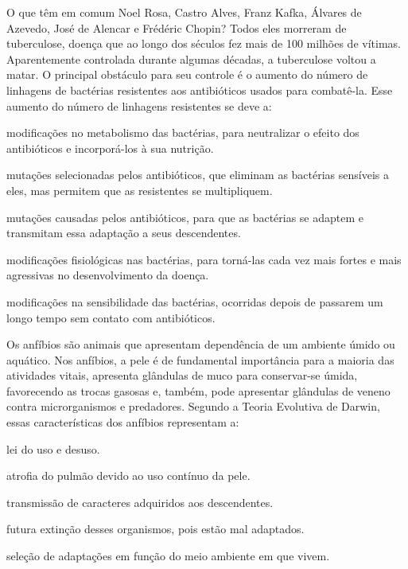 \questao
O que têm em comum Noel Rosa, Castro Alves, Franz Kafka, Álvares de Azevedo, José de Alencar e Frédéric Chopin? Todos eles morreram de tuberculose, doença que ao longo dos séculos fez mais de 100 milhões de vítimas. Aparentemente controlada durante algumas décadas, a tuberculose voltou a matar. O principal obstáculo para seu controle é o aumento do número de linhagens de bactérias resistentes aos antibióticos usados para combatê-la. Esse aumento do número de linhagens resistentes se deve a: 
\begin{alternativas}
\item modificações no metabolismo das bactérias, para neutralizar o efeito dos antibióticos e incorporá-los à sua nutrição. 
\item mutações selecionadas pelos antibióticos, que eliminam as bactérias sensíveis a eles, mas permitem que as resistentes se multipliquem. 
\item mutações causadas pelos antibióticos, para que as bactérias se adaptem e transmitam essa adaptação a seus descendentes. 
\item modificações fisiológicas nas bactérias, para torná-las cada vez mais fortes e mais agressivas no desenvolvimento da doença. 
\item modificações na sensibilidade das bactérias, ocorridas depois de passarem um longo tempo sem contato com antibióticos.
\end{alternativas}

\questao
Os anfíbios são animais que apresentam dependência de um ambiente úmido ou aquático. Nos anfíbios, a pele é de fundamental importância para a maioria das atividades vitais, apresenta glândulas de muco para conservar-se úmida, favorecendo as trocas gasosas e, também, pode apresentar glândulas de veneno contra microrganismos e predadores. Segundo a Teoria Evolutiva de Darwin, essas características dos anfíbios representam a:
\begin{alternativas}
\item lei do uso e desuso. 
\item atrofia do pulmão devido ao uso contínuo da pele. 
\item transmissão de caracteres adquiridos aos descendentes. 
\item futura extinção desses organismos, pois estão mal adaptados. 
\item seleção de adaptações em função do meio ambiente em que vivem.
\end{alternativas}

